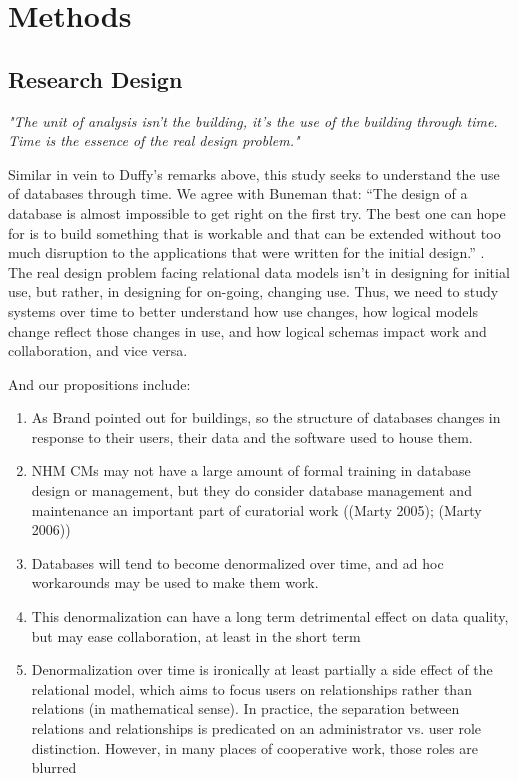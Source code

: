 \section{Methods}

\subsection{Research Design}
\textit{"The unit of analysis isn't the building, it's the use of the building through time. Time is the essence of the real design problem."}\cite{duffy1990measuring}

Similar in vein to Duffy's remarks above, this study seeks to understand the use of databases through time. We agree with Buneman that: “The design of a database is almost impossible to get right on the first try. The best one can hope for is to build something that is workable and that can be extended without too much disruption to the applications that were written for the initial design.”   \cite{buneman2008curated}. The real design problem facing relational data models isn't in designing for initial use, but rather, in designing for on-going, changing use.  Thus, we need to study systems over time to better understand how use changes, how logical models change reflect those changes in use, and how logical schemas impact work and collaboration, and vice versa.

And our propositions include:
\begin{enumerate}
\item As Brand pointed out for buildings, so the structure of databases changes in response to their users, their data and the software used to house them.
\item NHM CMs may not have a large amount of formal training in database design or management, but they do consider database management and maintenance an important part of curatorial work ((Marty 2005); (Marty 2006))
\item Databases will tend to become denormalized over time, and ad hoc workarounds may be used to make them work.
\item This denormalization can have a long term detrimental effect on data quality, but may ease collaboration, at least in the short term
\item Denormalization over time is ironically at least partially a side effect of the relational model, which aims to focus users on relationships rather than relations (in mathematical sense). In practice, the separation between relations and relationships is predicated on an administrator vs. user role distinction. However, in many places of cooperative work, those roles are blurred
\end{enumerate}

